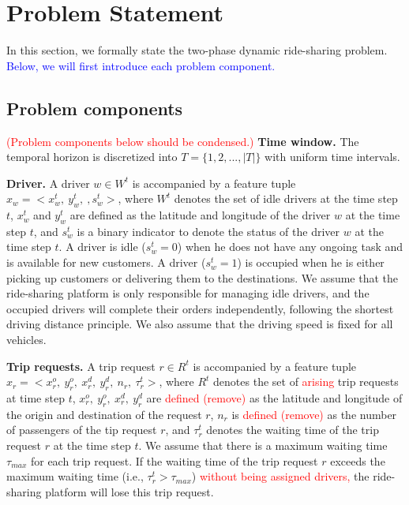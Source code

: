 \documentclass[sigconf]{acmart}
\newcommand{\tcr}[1]{{\textcolor{red}{#1}}}
\newcommand{\tcb}[1]{{\textcolor{blue}{#1}}}
\begin{document}
\section{Problem Statement}

In this section, we formally state the two-phase dynamic ride-sharing
problem. %
\tcb{Below, we will first introduce each problem component.}

\subsection{Problem components}

\tcr{(Problem components below should be condensed.)}
\noindent\textbf{Time window. } The temporal horizon is discretized into $T=\{1,2,...,|T|\}$ with uniform time intervals. 

\noindent\textbf{Driver. }A driver $w\in W^{t}$ is accompanied by a feature
tuple $x_{w}=<x_{w}^{t},\ y_{w}^{t},\ ,s_{w}^{t}>$, where $W^{t}$
denotes the set of idle drivers at the time step $t$, $x_{w}^{t}$
and $y_{w}^{t}$ are defined as the latitude and longitude of the
driver $w$ at the time step $t$, and $s_{w}^{t}$ is a binary indicator
to denote the status of the driver $w$ at the time step $t$. A driver
is idle ($s_{w}^{t}=0$) when he does not have any ongoing task and
is available for new customers. A driver ($s_{w}^{t}=1$) is occupied
when he is either picking up customers or delivering them to the destinations.
We assume that the ride-sharing platform is only responsible for managing
idle drivers, and the occupied drivers will complete their orders
independently, following the shortest driving distance principle.
We also assume that the driving speed is fixed for all vehicles. 

\noindent\textbf{Trip requests.} A trip request $r\in R^{t}$ is accompanied
by a feature tuple $x_{r}=<x_{r}^{o},\ y_{r}^{o},\ x_{r}^{d},\ y_{r}^{d},\ n_{r},\ \tau_{r}^{t}>$,
where $R^{t}$ denotes the set of \tcr{arising} trip requests at time
step $t$, $x_{r}^{o},\ y_{r}^{o},\ x_{r}^{d},\ y_{r}^{d}$ are \tcr{defined (remove)}
as the latitude and longitude of the origin and destination of the
request $r$, $n_{r}$ is \tcr{defined (remove)} as the number of passengers of the
tip request $r$, and $\tau_{r}^{t}$ denotes the waiting time of
the trip request $r$ at the time step $t$. We assume that there
is a maximum waiting time $\tau_{max}$ for each trip request. If
the waiting time of the trip request $r$ exceeds the maximum waiting
time (i.e., $\tau_{r}^{t}>\tau_{max}$) \tcr{without being assigned drivers,}
the ride-sharing platform will lose this trip request.
\end{document}
